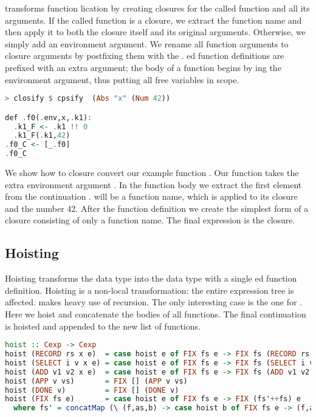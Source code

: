 { transforms function lication by creating closures for the called function and all its arguments. If the called function is a closure, we extract the function name and then apply it to both the closure itself and its original arguments. Otherwise, we simply add an environment argument. We rename all function arguments to closure arguments by postfixing them with the . ed function definitions are prefixed with an extra  argument; the body of a function begins by ing the environment argument, thus putting all free variables in scope.

\begin{lstlisting}[language=Haskell]
> closify $ cpsify  (Abs "x" (Num 42))

def .f0(.env,x,.k1):
  .k1_F <- .k1 !! 0
  .k1_F(.k1,42)
.f0_C <- [_.f0]
.f0_C
\end{lstlisting}

We show how to closure convert our example function . Our function  takes the extra environment argument . In the function body we extract the first element from the continuation .  will be a function name, which is applied to its closure and the number 42. After the function definition we create the simplest form of a closure consisting of only a function name. The final expression is the closure.

\subsection{\label{subsection:hoist}Hoisting}
Hoisting transforms the  data type into the  data type with a single ed function definition. Hoisting is a non-local transformation: the entire expression tree is affected.  makes heavy use of recursion. The only interesting case is the one for . Here we hoist and concatenate the bodies of all functions. The final continuation  is hoisted and appended to the new list of functions.

\begin{lstlisting}[language=Haskell]
hoist :: Cexp -> Cexp
hoist (RECORD rs x e)  = case hoist e of FIX fs e -> FIX fs (RECORD rs x e)
hoist (SELECT i v x e) = case hoist e of FIX fs e -> FIX fs (SELECT i v x e)
hoist (ADD v1 v2 x e)  = case hoist e of FIX fs e -> FIX fs (ADD v1 v2 x e)
hoist (APP v vs)       = FIX [] (APP v vs)
hoist (DONE v)         = FIX [] (DONE v)               
hoist (FIX fs e)       = case hoist e of FIX fs e -> FIX (fs'++fs) e
  where fs' = concatMap (\ (f,as,b) -> case hoist b of FIX fs e -> (f,as,e) : fs) fs
\end{lstlisting}

}

